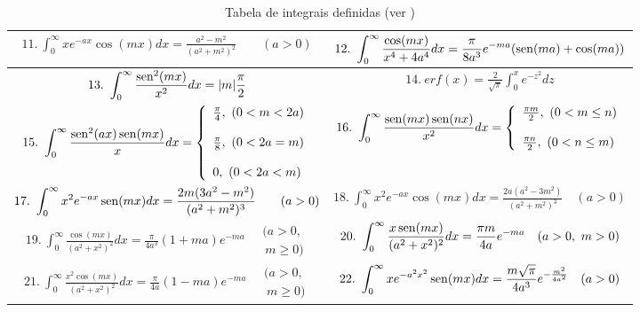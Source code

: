 \begin{table}
\begin{small}
\begin{center}
{\begin{tabu}{|c|c|}
$\displaystyle 11.\ \int_0^\infty xe^{-ax}\cos(mx)dx=\frac{a^2-m^2}{(a^2+m^2)^2}\qquad (a>0) $&$\displaystyle 12.\ \int_0^\infty \frac{\cos(mx)}{x^4+4a^4}dx=\frac{\pi}{8a^3}e^{-ma}(\operatorname{sen}(ma)+\cos(ma)) $ \\ \hline
$\displaystyle 13.\ \int_0^\infty \frac{\operatorname{sen}^2(mx)}{x^2}dx=|m|\frac{\pi}{2} $& $\displaystyle 14.\ erf(x)=\frac{2}{\sqrt{\pi}}\int_0^x e^{-z^2}dz $ \\ \hline
$\displaystyle 15.\ \int_0^\infty \frac{\sen^2(ax)\sen(mx)}{x}dx=\left\{\begin{array}{l}\frac{\pi }{4},\ (0<m<2a)\\\\\frac{\pi }{8},\ (0<2a=m)\\\\ 0,\ (0<2a<m) \end{array}\right. $& $\displaystyle 16.\ \int_0^\infty \frac{\sen(mx)\sen(nx)}{x^2}dx=\left\{\begin{array}{l}\frac{\pi m}{2},\ (0<m\leq n)\\\\\frac{\pi n}{2},\ (0<n\leq m) \end{array}\right. $ \\ \hline
$\displaystyle 17.\ \int_0^\infty x^2e^{-ax}\operatorname{sen}(mx)dx=\frac{2m(3a^2-m^2)}{(a^2+m^2)^3}\qquad (a>0) $& $\displaystyle 18.\ \int_0^\infty x^2e^{-ax}\cos(mx)dx=\frac{2a(a^2-3m^2)}{(a^2+m^2)^3}\quad (a>0) $ \\ \hline
$\displaystyle 19.\ \int_0^\infty \frac{\cos(mx)}{(a^2+x^2)^2}dx=\frac{\pi}{4a^3}(1+ma)e^{-ma}\quad \begin{array}{l}\!\!(a>0,\\ \ m\geq 0)\end{array} $& $\displaystyle 20.\ \int_0^\infty \frac{x\operatorname{sen}(mx)}{(a^2+x^2)^2}dx=\frac{\pi m}{4a}e^{-ma} \quad (a>0,\ m>0) $ \\ \hline
$\displaystyle 21.\ \int_0^\infty \frac{x^2\cos(mx)}{(a^2+x^2)^2}dx=\frac{\pi}{4a}(1-ma)e^{-ma}\quad \begin{array}{l}\!\!(a>0,\\ \ m\geq 0)\end{array} $& $\displaystyle 22.\ \int_0^\infty xe^{-a^2x^2}\operatorname{sen}(mx)dx=\frac{ m \sqrt{\pi}}{4a^3}e^{-\frac{m^2}{4a^2}} \quad (a>0) $\\ \hline
\end{tabu}
}
\caption{\label{tab_int_def}Tabela de integrais definidas (ver \cite{DWIGHT})}
\end{center}
\end{small}
\end{table}


